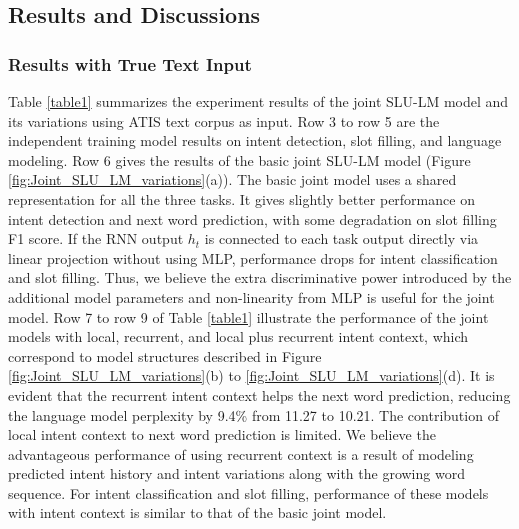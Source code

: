 \documentclass[11pt]{article}
\begin{document}
\subsection{Results and Discussions}
    \subsubsection{Results with True Text Input}
    Table \ref{table1} summarizes the experiment results of the joint SLU-LM model and its variations using ATIS text corpus as input. Row 3 to row 5 are the independent training model results on intent detection, slot filling, and language modeling. Row 6 gives the results of the basic joint SLU-LM model (Figure \ref{fig:Joint_SLU_LM_variations}(a)). The basic joint model uses a shared representation for all the three tasks. It gives slightly better performance on intent detection and next word prediction, with some degradation on slot filling F1 score. If the RNN output $h_t$ is connected to each task output directly via linear projection without using MLP, performance drops for intent classification and slot filling. Thus, we believe the extra discriminative power introduced by the additional model parameters and non-linearity from MLP is useful for the joint model. 
    Row 7 to row 9 of Table \ref{table1} illustrate the performance of the joint models with local, recurrent, and local plus recurrent intent context, which correspond to model structures described in Figure \ref{fig:Joint_SLU_LM_variations}(b) to \ref{fig:Joint_SLU_LM_variations}(d). It is evident that the recurrent intent context helps the next word prediction, reducing the language model perplexity by 9.4\% from 11.27 to 10.21. The contribution of local intent context to next word prediction is limited. We believe the advantageous performance of using recurrent context is a result of modeling predicted intent history and intent variations along with the growing word sequence. For intent classification and slot filling, performance of these models with intent context is similar to that of the basic joint model. 
    
\end{document}
